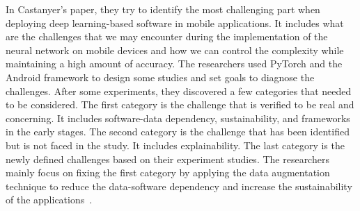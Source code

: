 \documentclass{article}
\begin{document}
In Castanyer's paper, they try to identify the most challenging part when deploying deep learning-based software in mobile applications. It includes what are the challenges that we may encounter during the implementation of the neural network on mobile devices and how we can control the complexity while maintaining a high amount of accuracy. The researchers used PyTorch and the Android framework to design some studies and set goals to diagnose the challenges. After some experiments, they discovered a few categories that needed to be considered. The first category is the challenge that is verified to be real and concerning. It includes software-data dependency, sustainability, and frameworks in the early stages. The second category is the challenge that has been identified but is not faced in the study. It includes explainability. The last category is the newly defined challenges based on their experiment studies. The researchers mainly focus on fixing the first category by applying the data augmentation technique to reduce the data-software dependency and increase the sustainability of the applications~\cite{cast2020integration}.


\pagebreak
\small

% 
  
\end{document}
